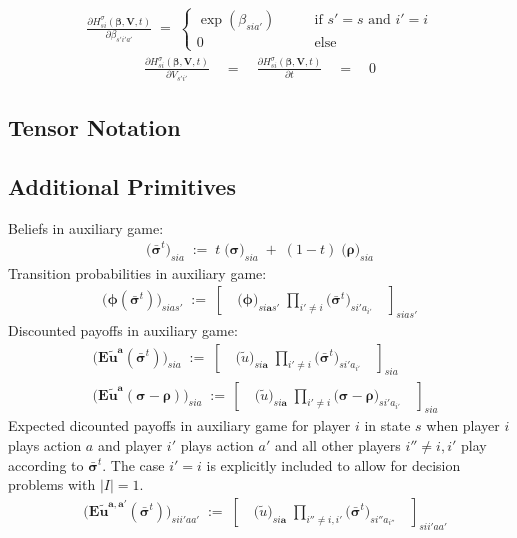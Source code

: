 \documentclass[11pt,fleqn]{article}
\newcommand{\bsigma}{\bm{\sigma}}
\newcommand{\bbeta}{\bm{\beta}}
\newcommand{\brho}{\bm{\rho}}
\newcommand{\bV}{\bm{V}}
\newcommand{\ba}{\bm{a}}
\newcommand{\tu}{\tilde{u}}
\begin{document}
\begin{align*}
	\frac{ \partial H^\sigma_{si}(\bbeta,\bV,t) }{ \partial \beta_{s'i'a'}} \;=\; 
		\begin{cases}
			\exp(\beta_{sia'}) \qquad&\text{if } s'=s \text{ and } i'=i \\
			0 \qquad&\text{else}  
		\end{cases}
\end{align*}
\begin{align*}
	\frac{ \partial H^\sigma_{si}(\bbeta,\bV,t) }{ \partial V_{s'i'} } \quad=\quad \frac{ \partial H^\sigma_{si}(\bbeta,\bV,t) }{ \partial t } \quad=\quad 0
\end{align*}




\subsection*{Tensor Notation}


\subsection*{Additional Primitives}

Beliefs in auxiliary game:
\begin{align*}
	\biggl( \bar{\bsigma}^t \biggr)_{sia} \;:=\; t \; \biggl( \bsigma \biggr)_{sia} \;+\; (1-t) \; \biggl( \brho \biggr)_{sia}
\end{align*}
Transition probabilities in auxiliary game:
\begin{align*}
	\biggl( \bm{\phi}(\bar{\bsigma}^t) \biggr)_{sias'} \;:=\; \left[ \quad \biggl( \bm{\phi} \biggr)_{si\ba s'} \; \prod\limits_{i'\neq i} \biggl( \bar{\bsigma}^t \biggr)_{si'a_{i'}} \quad \right]_{sias'}
\end{align*}
Discounted payoffs in auxiliary game:
\begin{align*}
	& \biggl( \bm{{E\tu^{a}}}(\bar{\bsigma}^t) \biggr)_{sia} \;:=\; \left[ \quad \biggl( \tu \biggr)_{si\ba} \; \prod\limits_{i'\neq i} \biggl( \bar{\bsigma}^t \biggr)_{si'a_{i'}} \quad \right]_{sia} \\
	& \biggl( \bm{{E\tu^{a}}}(\bsigma-\brho) \biggr)_{sia} \;:=\, \left[ \quad \biggl( \tu \biggr)_{si\ba} \; \prod\limits_{i'\neq i} \biggl( \bsigma-\brho \biggr)_{si'a_{i'}} \quad \right]_{sia}
\end{align*}
Expected dicounted payoffs in auxiliary game for player $i$ in state $s$ when player $i$ plays action $a$ and player $i'$ plays action $a'$ and all other players $i'' \neq i, i'$ play according to $\bar{\bsigma}^t$. The case $i'=i$ is explicitly included to allow for decision problems with $|I|=1$. 
\begin{align*}
	& \biggl( \bm{{E\tu^{a,a'}}}(\bar{\bsigma}^t) \biggr)_{sii'aa'} \;:=\; \left[ \quad \biggl( \tu \biggr)_{si\ba} \; \prod\limits_{i''\neq i,i'} \biggl( \bar{\bsigma}^t \biggr)_{si''a_{i''}} \quad \right]_{sii'aa'}
\end{align*}
\end{document}
